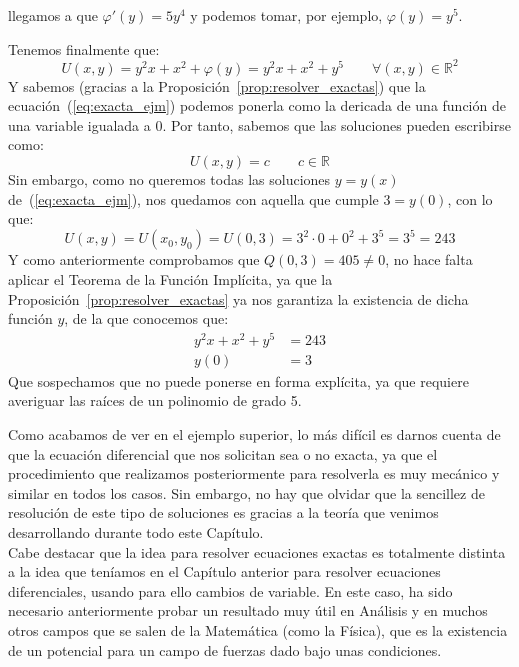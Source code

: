 \begin{ejemplo}
    llegamos a que $\varphi'(y) = 5y^4$ y podemos tomar, por ejemplo, $\varphi(y)=y^5$.

    Tenemos finalmente que:
    \begin{equation*}
        U(x,y) = y^2x+x^2+\varphi(y)= y^2x+x^2+y^5 \qquad \forall (x,y)\in \mathbb{R}^2
    \end{equation*}
    Y sabemos (gracias a la Proposición~\ref{prop:resolver_exactas}) que la ecuación~(\ref{eq:exacta_ejm}) podemos ponerla como la dericada de una función de una variable igualada a 0. Por tanto, sabemos que las soluciones pueden escribirse como:
    \begin{equation*}
        U(x,y) = c  \qquad c\in \mathbb{R}
    \end{equation*}
    Sin embargo, como no queremos todas las soluciones $y=y(x)$ de~(\ref{eq:exacta_ejm}), nos quedamos con aquella que cumple $3=y(0)$, con lo que:
    \begin{equation*}
        U(x,y) = U(x_0,y_0) = U(0,3) = 3^2\cdot 0 + 0^2 + 3^5 = 3^5 = 243
    \end{equation*}
    Y como anteriormente comprobamos que $Q(0,3) = 405 \neq 0$, no hace falta aplicar el Teorema de la Función Implícita, ya que la Proposición~\ref{prop:resolver_exactas} ya nos garantiza la existencia de dicha función $y$, de la que conocemos que:
    \begin{align*}
            y^2x + x^2 + y^5 &= 243 \\
            y(0) &= 3
    \end{align*}
    Que sospechamos que no puede ponerse en forma explícita, ya que requiere averiguar las raíces de un polinomio de grado 5.
\end{ejemplo}
Como acabamos de ver en el ejemplo superior, lo más difícil es darnos cuenta de que la ecuación diferencial que nos solicitan sea o no exacta, ya que el procedimiento que realizamos posteriormente para resolverla es muy mecánico y similar en todos los casos. Sin embargo, no hay que olvidar que la sencillez de resolución de este tipo de soluciones es gracias a la teoría que venimos desarrollando durante todo este Capítulo.\\

Cabe destacar que la idea para resolver ecuaciones exactas es totalmente distinta a la idea que teníamos en el Capítulo anterior para resolver ecuaciones diferenciales, usando para ello cambios de variable. En este caso, ha sido necesario anteriormente probar un resultado muy útil en Análisis y en muchos otros campos que se salen de la Matemática (como la Física), que es la existencia de un potencial para un campo de fuerzas dado bajo unas condiciones.


